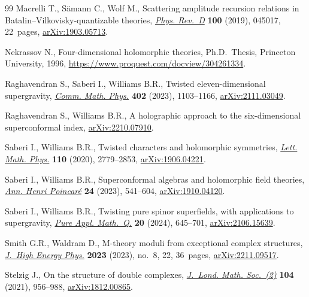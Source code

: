 \begin{thebibliography}{99}
Macrelli T., S\"amann C., Wolf M., Scattering amplitude recursion relations in
 {B}atalin--{V}ilkovisky-quantizable theories,
 \href{https://doi.org/10.1103/physrevd.100.045017}{\textit{Phys. Rev.~D}}
 \textbf{100} (2019), 045017, 22~pages,
 \href{http://arxiv.org/abs/1903.05713}{arXiv:1903.05713}.

Nekrassov N., Four-dimensional holomorphic theories, Ph.D.~Thesis, {P}rinceton
 University, 1996, \url{https://www.proquest.com/docview/304261334}.

Raghavendran S., Saberi I., Williams B.R., Twisted eleven-dimensional
 supergravity, \href{https://doi.org/10.1007/s00220-023-04745-2}{\textit{Comm.
 Math. Phys.}} \textbf{402} (2023), 1103--1166,
 \href{http://arxiv.org/abs/2111.03049}{arXiv:2111.03049}.

Raghavendran S., Williams B.R., A holographic approach to the six-dimensional
 superconformal index,
 \href{http://arxiv.org/abs/2210.07910}{arXiv:2210.07910}.

Saberi I., Williams B.R., Twisted characters and holomorphic symmetries,
 \href{https://doi.org/10.1007/s11005-020-01319-4}{\textit{Lett. Math. Phys.}}
 \textbf{110} (2020), 2779--2853,
 \href{http://arxiv.org/abs/1906.04221}{arXiv:1906.04221}.

Saberi I., Williams B.R., Superconformal algebras and holomorphic field
 theories, \href{https://doi.org/10.1007/s00023-022-01224-7}{\textit{Ann.
 Henri Poincar\'e}} \textbf{24} (2023), 541--604,
 \href{http://arxiv.org/abs/1910.04120}{arXiv:1910.04120}.

Saberi I., Williams B.R., Twisting pure spinor superfields, with applications
 to supergravity,
 \href{https://doi.org/10.4310/pamq.2024.v20.n2.a2}{\textit{Pure Appl.
 Math.~Q.}} \textbf{20} (2024), 645--701,
 \href{http://arxiv.org/abs/2106.15639}{arXiv:2106.15639}.

Smith G.R., Waldram D., M-theory moduli from exceptional complex structures,
 \href{https://doi.org/10.1007/jhep08(2023)022}{\textit{J.~High Energy Phys.}}
 \textbf{2023} (2023), no.~8, 22, 36~pages,
 \href{http://arxiv.org/abs/2211.09517}{arXiv:2211.09517}.

Stelzig J., On the structure of double complexes,
 \href{https://doi.org/10.1112/jlms.12453}{\textit{J.~Lond. Math. Soc.~(2)}}
 \textbf{104} (2021), 956--988,
 \href{http://arxiv.org/abs/1812.00865}{arXiv:1812.00865}.


\end{thebibliography}
